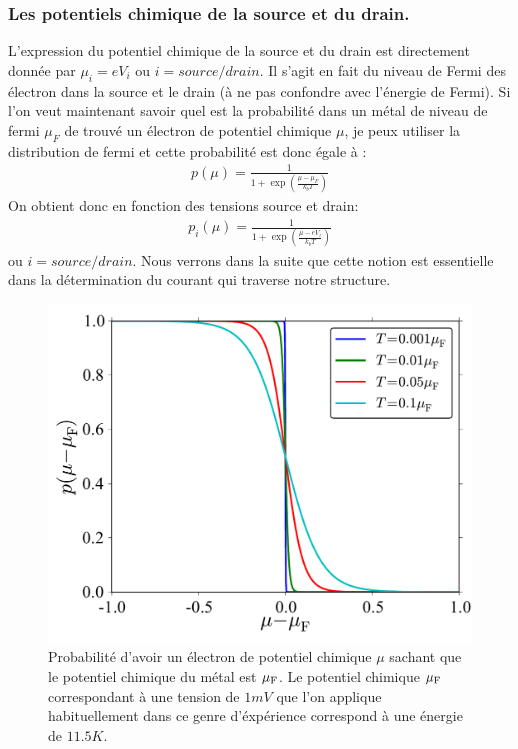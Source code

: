 \subsubsection{Les potentiels chimique de la source et du drain.}
L'expression du potentiel chimique de la source et du drain est directement donnée par $\mu_i = e V_i$ ou $i=source/drain$. Il s'agit en fait du niveau de Fermi des électron dans la source et le drain (à ne pas confondre avec l'énergie de Fermi). Si l'on veut maintenant savoir quel est la probabilité dans un métal de niveau de fermi $\mu_F$ de trouvé un électron de potentiel chimique $\mu$, je peux utiliser la distribution de fermi et cette probabilité est donc égale à :
\begin{eqnarray}
p(\mu) = \frac{1}{1 + \exp{(\frac{\mu - \mu_F}{k_bT})}} \nonumber
\end{eqnarray}
 On obtient donc en fonction des tensions source et drain:
\begin{eqnarray}
p_i(\mu) = \frac{1}{1 + \exp{(\frac{\mu - eV_i}{k_bT})}}
\end{eqnarray}
ou $i=source/drain$. Nous verrons dans la suite que cette notion est essentielle dans la détermination du courant qui traverse notre structure.

\begin{figure}
\includegraphics[scale=0.8]{Theorie/Transport/figure2/figure2.pdf} 
\caption{Probabilité d'avoir un électron de potentiel chimique $\mu$ sachant que le potentiel chimique du métal est $\mu_{\rm{F}}$. Le potentiel chimique $\mu_{\rm{F}}$ correspondant à une tension de $1mV$ que l'on applique habituellement dans ce genre d'éxpérience correspond à une énergie de $11.5K$.}
\label{distrib_fermi}
\end{figure}



